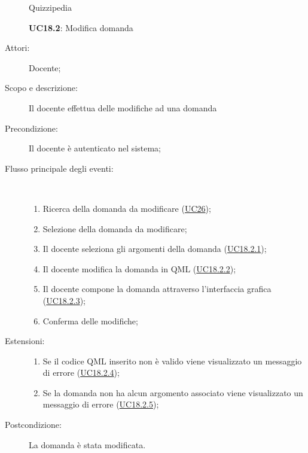 \begin{figure}[H]
	\centering
	\begin{resizedtikzpicture}{\textwidth}
		\begin{umlsystem}[x=0, fill=lightgray!20]{Quizzipedia}
		\end{umlsystem}
	\end{resizedtikzpicture}
	\caption{\textbf{UC18.2}: Modifica domanda}
	\label{UC18.2}
\end{figure}
\begin{description}
	\item[Attori:] Docente;
	\item[Scopo e descrizione:] Il docente effettua delle modifiche ad una domanda 
	\item[Precondizione:] Il docente è autenticato nel sistema;
	
	\item[Flusso principale degli eventi:] \ 
	\begin{enumerate}
		\item Ricerca della domanda da modificare (\hyperlink{UC26}{UC26});
		\item Selezione della domanda da modificare;
		\item Il docente seleziona gli argomenti della domanda	 (\hyperlink{UC18.2.1}{UC18.2.1});
		\item Il docente modifica la domanda in QML	 (\hyperlink{UC18.2.2}{UC18.2.2});
		\item Il docente compone la domanda attraverso l'interfaccia grafica (\hyperlink{UC18.2.3}{UC18.2.3});
		\item Conferma delle modifiche;
		
	\end{enumerate}
	\item[Estensioni:]
	\begin{enumerate}
		\item Se il codice QML inserito non è valido viene visualizzato un messaggio di errore (\hyperlink{UC18.2.4}{UC18.2.4});
		\item Se la domanda non ha alcun argomento associato viene visualizzato un messaggio di errore (\hyperlink{UC18.2.5}{UC18.2.5});
		
	\end{enumerate}
	\item[Postcondizione:] La domanda è stata modificata.
\end{description}
\hypertarget{UC18.2.1}{}
